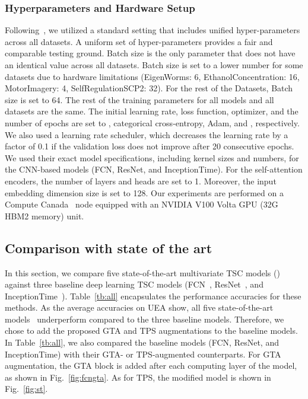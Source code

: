 \documentclass[journal]{IEEEtran}
\begin{document}
\subsubsection{Hyperparameters and Hardware Setup}
Following~\cite{fawaz2020inceptiontime,rank1}, we utilized a standard setting that includes unified hyper-parameters across all datasets. A uniform set of hyper-parameters provides a fair and comparable testing ground. Batch size is the only parameter that does not have an identical value across all datasets. Batch size is set to a lower number for some datasets due to hardware limitations (EigenWorms: 6, EthanolConcentration: 16, MotorImagery: 4, SelfRegulationSCP2: 32). For the rest of the Datasets, Batch size is set to 64. The rest of the training parameters for all models and all datasets are the same. The initial learning rate, loss function, optimizer, and the number of epochs are set to , categorical cross-entropy, Adam, and , respectively. We also used a learning rate scheduler, which decreases the learning rate by a factor of 0.1 if the validation loss does not improve after 20 consecutive epochs. We used their exact model specifications, including kernel sizes and numbers, for the CNN-based models (FCN, ResNet, and InceptionTime). For the self-attention encoders, the number of layers and heads are set to 1. Moreover, the input embedding dimension size is set to 128. Our experiments are performed on a Compute Canada~\cite{compute-canada} node equipped with an NVIDIA V100 Volta GPU (32G HBM2 memory) unit.

\subsection{Comparison with state of the art}
In this section, we compare five state-of-the-art multivariate TSC models (\cite{chen_da-net_2022,tapnet,tang_omni-scale_2022,xcm,shapenet}) against three baseline deep learning TSC models (FCN~\cite{wang2017time}, ResNet~\cite{wang2017time}, and InceptionTime~\cite{fawaz2020inceptiontime}). Table~\ref{tb:all} encapsulates the performance accuracies for these methods. As the average accuracies on UEA show, all five state-of-the-art models~\cite{chen_da-net_2022,tapnet,tang_omni-scale_2022,xcm,shapenet} underperform compared to the three baseline models. Therefore, we chose to add the proposed GTA and TPS augmentations to the baseline models. In Table~\ref{tb:all}, we also compared the baseline models (FCN, ResNet, and InceptionTime) with their GTA- or TPS-augmented counterparts. For GTA augmentation, the GTA block is added after each computing layer of the model, as shown in Fig.~\ref{fig:fcngta}. As for TPS, the modified model is shown in Fig.~\ref{fig:st}. 
\end{document}
